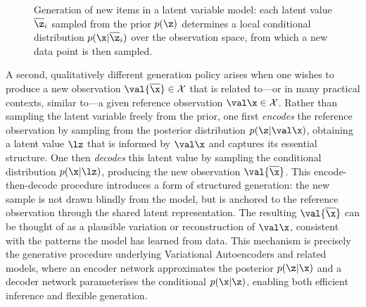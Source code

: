 \begin{figure}[ht]
\begin{center}
\caption{Generation of new items in a latent variable model: each latent value $\overline{\z}_i$
sampled from the prior $p(\z)$ determines a local conditional distribution
$p(\x|\overline{\z}_i)$ over the observation space, from which a new data point is then
sampled.}\label{f:gen}
\end{center}
\end{figure}

A second, qualitatively different generation policy arises when one wishes to produce a
new observation $\val{\overline\x} \in \mathcal{X}$ that is related to---or in many practical
contexts, similar to---a given reference observation $\val\x \in \mathcal{X}$. Rather than
sampling the latent variable freely from the prior, one first \emph{encodes} the reference
observation by sampling from the posterior distribution $p(\z|\val\x)$, obtaining a latent
value $\lz$ that is informed by $\val\x$ and captures its essential structure. One then
\emph{decodes} this latent value by sampling the conditional distribution $p(\x|\lz)$,
producing the new observation $\val{\overline\x}$. This encode-then-decode procedure
introduces a form of structured generation: the new sample is not drawn blindly from the
model, but is anchored to the reference observation through the shared latent
representation. The resulting $\val{\overline\x}$ can be thought of as a plausible variation
or reconstruction of $\val\x$, consistent with the patterns the model has learned from data.
This mechanism is precisely the generative procedure underlying Variational Autoencoders
and related models, where an encoder network approximates the posterior $p(\z|\x)$ and a
decoder network parameterises the conditional $p(\x|\z)$, enabling both efficient inference
and flexible generation.

